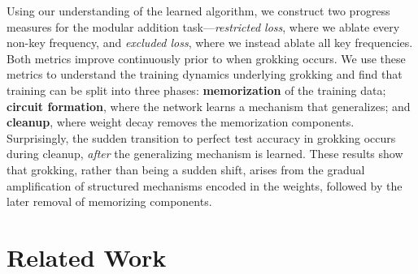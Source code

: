 \documentclass{article} %
\newcommand{\cosp}[1]{\cos \left ( #1 \right )}
\begin{document}
Using our understanding of the learned algorithm, we construct two progress measures for the modular addition task---\textit{restricted loss}, where we ablate every non-key frequency, and \textit{excluded loss}, where we instead ablate all key frequencies. %
Both metrics improve continuously prior to when grokking occurs. 
We use these metrics to understand the training dynamics underlying grokking and find that training can be split into three phases: \textbf{memorization} of the training data; \textbf{circuit formation}, where the network learns a mechanism that generalizes; and \textbf{cleanup}, where weight decay removes the memorization components. Surprisingly, the sudden transition to perfect test accuracy in grokking occurs during cleanup, \emph{after} the generalizing mechanism is learned. 
These results show that grokking, rather than being a sudden shift, arises from the gradual amplification of structured mechanisms encoded in the weights, followed by the later removal of memorizing components.



\section{Related Work}
\end{document}
